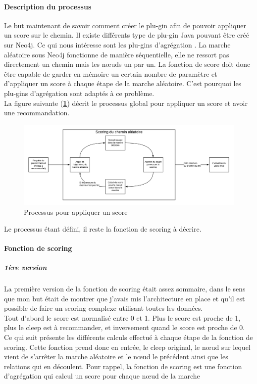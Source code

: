 \documentclass{article} %
\begin{document}
\paragraph{Description du processus\\}
Le but maintenant de savoir comment créer le plu-gin afin de pouvoir appliquer un score sur le chemin. Il existe différents type de plu-gin Java pouvant être créé sur Neo4j. Ce qui nous intéresse sont les plu-gins d'agrégation \cite{aggrg}. La marche aléatoire sous Neo4j fonctionne de manière séquentielle, elle ne ressort pas directement un chemin mais les nœuds un par un. La fonction de score doit donc être capable de garder en mémoire un certain nombre de paramètre et d'appliquer un score à chaque étape de la marche aléatoire. C'est pourquoi les plu-gins d'agrégation sont adaptés à ce problème.\\
La figure suivante (\textbf{\ref{fig:algo}}) décrit le processus global pour appliquer un score et avoir une recommandation.
\begin{figure}[!h]
	\centering
	\includegraphics[keepaspectratio = true,scale=0.7]{proccleep.png}
	\caption{Processus pour appliquer un score}
	\label{fig:algo}
\end{figure}

Le processus étant défini, il reste la fonction de scoring à décrire. 

\paragraph{Fonction de scoring\\}
\subparagraph{1ère version\\}
La première version de la fonction de scoring était assez sommaire, dans le sens que mon but était de montrer que j'avais mis l'architecture en place et qu'il est possible de faire un scoring complexe utilisant toutes les données.\\
Tout d'abord le score est normalisé entre 0 et 1. Plus le score est proche de 1, plus le cleep est à recommander, et inversement quand le score est proche de 0. Ce qui suit présente les différents calculs effectué à chaque étape de la fonction de scoring. Cette fonction prend donc en entrée, le cleep original, le nœud sur lequel vient de s'arrêter la marche aléatoire et le nœud le précédent ainsi que les relations qui en découlent. Pour rappel, la fonction de scoring est une fonction d'agrégation qui calcul un score pour chaque nœud de la marche\\
\end{document}
